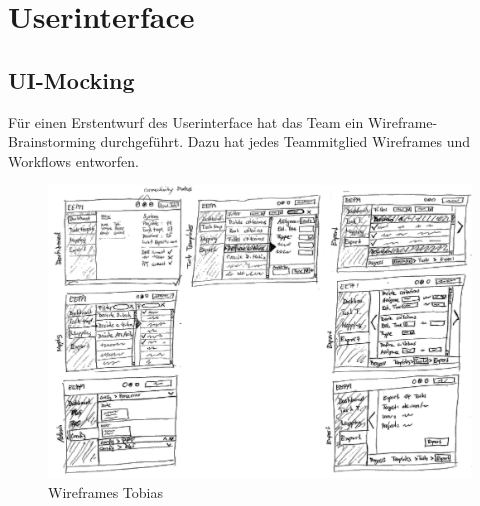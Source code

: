 \section{Userinterface}
	\subsection{UI-Mocking}
	
		Für einen Erstentwurf des Userinterface hat das Team ein Wireframe-Brainstorming durchgeführt.
		Dazu hat jedes Teammitglied Wireframes und Workflows entworfen.
	
		\begin{figure}[H]
			\includegraphics[width=\linewidth]{interfacesAndProtocols/media/img/wireframesTobias1.jpg}
			\centering
			\caption{Wireframes Tobias}
			\label{fig:wireframesTobias1}
		\end{figure}
		
